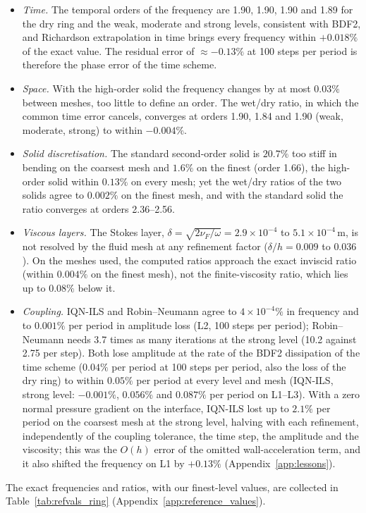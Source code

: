 \begin{itemize}
	\item \emph{Time.} The temporal orders of the frequency are 1.90, 1.90, 1.90 and 1.89 for the dry ring and the weak, moderate and strong levels, consistent with BDF2, and Richardson extrapolation in time brings every frequency within $+0.018\%$ of the exact value. The residual error of $\approx-0.13\%$ at 100 steps per period is therefore the phase error of the time scheme.
	\item \emph{Space.} With the high-order solid the frequency changes by at most $0.03\%$ between meshes, too little to define an order. The wet/dry ratio, in which the common time error cancels, converges at orders 1.90, 1.84 and 1.90 (weak, moderate, strong) to within $-0.004\%$.
	\item \emph{Solid discretisation.} The standard second-order solid is $20.7\%$ too stiff in bending on the coarsest mesh and $1.6\%$ on the finest (order 1.66), the high-order solid within $0.13\%$ on every mesh; yet the wet/dry ratios of the two solids agree to $0.002\%$ on the finest mesh, and with the standard solid the ratio converges at orders 2.36--2.56.
	\item \emph{Viscous layers.} The Stokes layer, $\delta=\sqrt{2\nu_F/\omega}=2.9\times10^{-4}$ to $5.1\times10^{-4}\,\mathrm{m}$, is not resolved by the fluid mesh at any refinement factor ($\delta/h=0.009$ to $0.036$). On the meshes used, the computed ratios approach the exact inviscid ratio (within $0.004\%$ on the finest mesh), not the finite-viscosity ratio, which lies up to $0.08\%$ below it.
	\item \emph{Coupling.} IQN-ILS and Robin--Neumann agree to $4\times10^{-4}\%$ in frequency and to $0.001\%$ per period in amplitude loss (L2, 100 steps per period); Robin--Neumann needs 3.7 times as many iterations at the strong level (10.2 against 2.75 per step). Both lose amplitude at the rate of the BDF2 dissipation of the time scheme ($0.04\%$ per period at 100 steps per period, also the loss of the dry ring) to within $0.05\%$ per period at every level and mesh (IQN-ILS, strong level: $-0.001\%$, $0.056\%$ and $0.087\%$ per period on L1--L3). With a zero normal pressure gradient on the interface, IQN-ILS lost up to $2.1\%$ per period on the coarsest mesh at the strong level, halving with each refinement, independently of the coupling tolerance, the time step, the amplitude and the viscosity; this was the $O(h)$ error of the omitted wall-acceleration term, and it also shifted the frequency on L1 by $+0.13\%$ (Appendix~\ref{app:lessons}).
\end{itemize}
The exact frequencies and ratios, with our finest-level values, are collected in Table~\ref{tab:refvals_ring} (Appendix~\ref{app:reference_values}).

